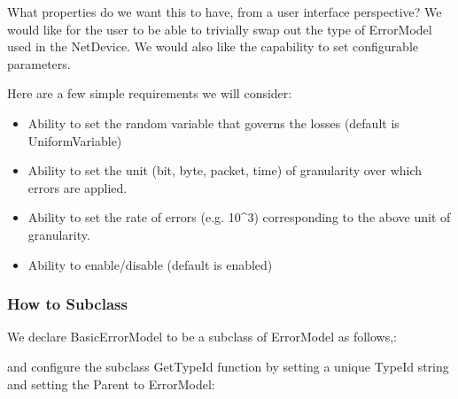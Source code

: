 \documentclass[letterpaper,10pt,english]{sphinxmanual}
\begin{document}
What properties do we want this to have, from a user interface perspective? We
would like for the user to be able to trivially swap out the type of ErrorModel
used in the NetDevice. We would also like the capability to set configurable
parameters.

Here are a few simple requirements we will consider:
\begin{itemize}
\item {} 
Ability to set the random variable that governs the losses (default is
UniformVariable)

\item {} 
Ability to set the unit (bit, byte, packet, time) of granularity over which
errors are applied.

\item {} 
Ability to set the rate of errors (e.g. 10\textasciicircum{}\sphinxhyphen{}3) corresponding to the above unit
of granularity.

\item {} 
Ability to enable/disable (default is enabled)

\end{itemize}


\subsubsection{How to Subclass}
\label{\detokenize{new-models:how-to-subclass}}
We declare BasicErrorModel to be a subclass of ErrorModel as follows,:

\begin{sphinxVerbatim}[commandchars=\\\{\}]
    
     
      
     
\end{sphinxVerbatim}

and configure the subclass GetTypeId function by setting a unique TypeId string
and setting the Parent to ErrorModel:
\end{document}
